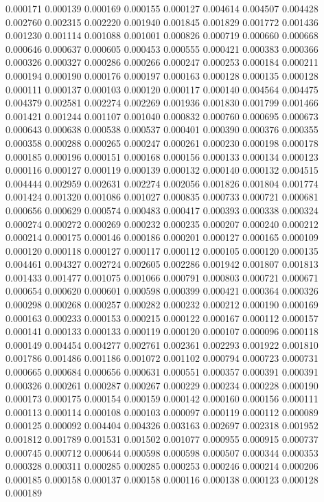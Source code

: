 0.000171
0.000139
0.000169
0.000155
0.000127
0.004614
0.004507
0.004428
0.002760
0.002315
0.002220
0.001940
0.001845
0.001829
0.001772
0.001436
0.001230
0.001114
0.001088
0.001001
0.000826
0.000719
0.000660
0.000668
0.000646
0.000637
0.000605
0.000453
0.000555
0.000421
0.000383
0.000366
0.000326
0.000327
0.000286
0.000266
0.000247
0.000253
0.000184
0.000211
0.000194
0.000190
0.000176
0.000197
0.000163
0.000128
0.000135
0.000128
0.000111
0.000137
0.000103
0.000120
0.000117
0.000140
0.004564
0.004475
0.004379
0.002581
0.002274
0.002269
0.001936
0.001830
0.001799
0.001466
0.001421
0.001244
0.001107
0.001040
0.000832
0.000760
0.000695
0.000673
0.000643
0.000638
0.000538
0.000537
0.000401
0.000390
0.000376
0.000355
0.000358
0.000288
0.000265
0.000247
0.000261
0.000230
0.000198
0.000178
0.000185
0.000196
0.000151
0.000168
0.000156
0.000133
0.000134
0.000123
0.000116
0.000127
0.000119
0.000139
0.000132
0.000140
0.000132
0.004515
0.004444
0.002959
0.002631
0.002274
0.002056
0.001826
0.001804
0.001774
0.001424
0.001320
0.001086
0.001027
0.000835
0.000733
0.000721
0.000681
0.000656
0.000629
0.000574
0.000483
0.000417
0.000393
0.000338
0.000324
0.000274
0.000272
0.000269
0.000232
0.000235
0.000207
0.000240
0.000212
0.000214
0.000175
0.000146
0.000186
0.000201
0.000127
0.000165
0.000109
0.000120
0.000118
0.000127
0.000117
0.000112
0.000105
0.000120
0.000135
0.004461
0.004327
0.002724
0.002605
0.002286
0.001942
0.001807
0.001813
0.001433
0.001477
0.001075
0.001066
0.000791
0.000803
0.000721
0.000671
0.000654
0.000620
0.000601
0.000598
0.000399
0.000421
0.000364
0.000326
0.000298
0.000268
0.000257
0.000282
0.000232
0.000212
0.000190
0.000169
0.000163
0.000233
0.000153
0.000215
0.000122
0.000167
0.000112
0.000157
0.000141
0.000133
0.000133
0.000119
0.000120
0.000107
0.000096
0.000118
0.000149
0.004454
0.004277
0.002761
0.002361
0.002293
0.001922
0.001810
0.001786
0.001486
0.001186
0.001072
0.001102
0.000794
0.000723
0.000731
0.000665
0.000684
0.000656
0.000631
0.000551
0.000357
0.000391
0.000391
0.000326
0.000261
0.000287
0.000267
0.000229
0.000234
0.000228
0.000190
0.000173
0.000175
0.000154
0.000159
0.000142
0.000160
0.000156
0.000111
0.000113
0.000114
0.000108
0.000103
0.000097
0.000119
0.000112
0.000089
0.000125
0.000092
0.004404
0.004326
0.003163
0.002697
0.002318
0.001952
0.001812
0.001789
0.001531
0.001502
0.001077
0.000955
0.000915
0.000737
0.000745
0.000712
0.000644
0.000598
0.000598
0.000507
0.000344
0.000353
0.000328
0.000311
0.000285
0.000285
0.000253
0.000246
0.000214
0.000206
0.000185
0.000158
0.000137
0.000158
0.000116
0.000138
0.000123
0.000128
0.000189
